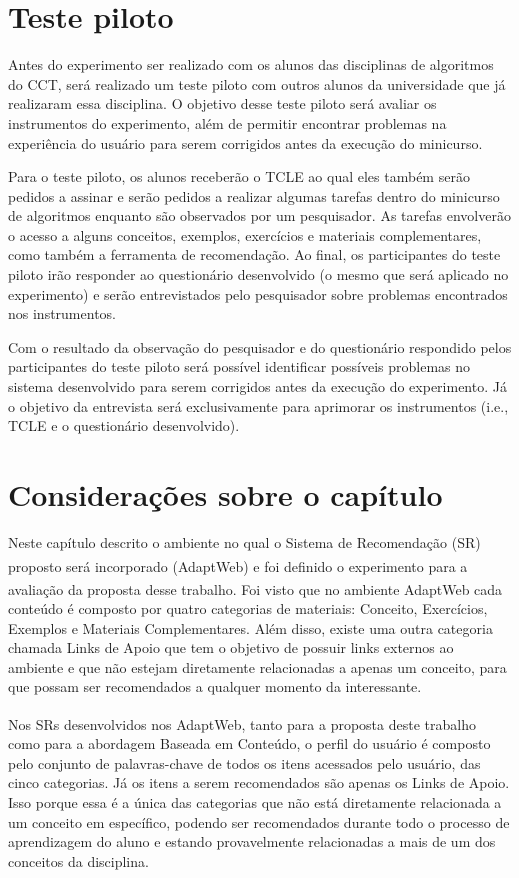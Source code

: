 \section{Teste piloto}

Antes do experimento ser realizado com os alunos das disciplinas de algoritmos do CCT, será realizado um teste piloto com
outros alunos da universidade que já realizaram essa disciplina. O objetivo desse teste piloto será avaliar os
instrumentos do experimento, além de permitir encontrar problemas na experiência do  usuário para serem corrigidos
antes da execução do minicurso.

Para o teste piloto, os alunos receberão o TCLE ao qual eles também serão pedidos a assinar e serão pedidos a realizar algumas
tarefas dentro do minicurso de algoritmos enquanto são observados por um pesquisador. As tarefas envolverão o acesso a
alguns conceitos, exemplos, exercícios e materiais complementares, como também a ferramenta de recomendação. Ao final, os
participantes do teste piloto irão responder ao questionário desenvolvido (o mesmo que será aplicado no experimento) e
serão entrevistados pelo pesquisador sobre problemas encontrados nos instrumentos.

Com o resultado da observação do pesquisador e do questionário respondido pelos participantes do teste piloto será possível
identificar possíveis problemas no sistema desenvolvido para serem corrigidos antes da execução do experimento. Já o objetivo da
entrevista será exclusivamente para aprimorar os instrumentos (i.e., TCLE e o questionário desenvolvido).

\section{Considerações sobre o capítulo}

Neste capítulo descrito o ambiente no qual o Sistema de Recomendação (SR) proposto será incorporado (AdaptWeb\textsuperscript{\textregistered}) e foi definido o
experimento para a avaliação da proposta desse trabalho. Foi visto que no ambiente AdaptWeb\textsuperscript{\textregistered}
cada conteúdo é composto por quatro categorias de materiais: Conceito, Exercícios, Exemplos e Materiais Complementares.
Além disso, existe uma outra categoria chamada Links de Apoio que tem o objetivo de possuir links externos ao ambiente e que
não estejam diretamente relacionadas a apenas um conceito, para que possam ser recomendados a qualquer momento da interessante.

Nos SRs desenvolvidos nos AdaptWeb\textsuperscript{\textregistered}, tanto para a proposta deste trabalho como para a abordagem
Baseada em Conteúdo, o perfil do usuário é composto pelo conjunto de palavras-chave de todos os itens acessados pelo usuário, das
cinco categorias. Já os itens a serem recomendados são apenas os Links de Apoio. Isso porque essa é a única das categorias
que não está diretamente relacionada a um conceito em específico, podendo ser recomendados durante todo o processo de
aprendizagem do aluno e estando provavelmente relacionadas a mais de um dos conceitos da disciplina.

